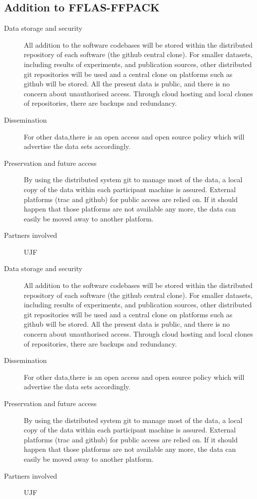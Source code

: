 \documentclass{../../Proposal/LaTeX-proposal/deliverablereport}
\begin{document}
\begin{enumerate}
\subsection{Addition to FFLAS-FFPACK}

\begin{description}
\item[Data storage and security] All addition to the software codebases will be stored within the distributed repository of each software (the github central clone). For smaller datasets, including results of experiments, and publication sources, other distributed git repositories will be used and a central clone on platforms such as github will be stored. All the present data is public, and there is no concern about unauthorised access. Through cloud hosting and local clones of repositories, there are backups and redundancy.
\item[Dissemination] For other data,there is an open access and open source policy which will advertise the data sets accordingly.
\item[Preservation and future access] By using the distributed system git to manage most of the data, a local copy of the data within each participant machine is assured. External platforms (trac and github) for public access are relied on. If it should happen that those platforms are not available any more, the data can easily be moved away to another platform.
\item[Partners involved] UJF
\end{description}

\begin{description}
\item[Data storage and security] All addition to the software codebases will be stored within the distributed repository of each software (the github central clone). For smaller datasets, including results of experiments, and publication sources, other distributed git repositories will be used and a central clone on platforms such as github will be stored. All the present data is public, and there is no concern about unauthorised access. Through cloud hosting and local clones of repositories, there are backups and redundancy.
\item[Dissemination] For other data,there is an open access and open source policy which will advertise the data sets accordingly.
\item[Preservation and future access] By using the distributed system git to manage most of the data, a local copy of the data within each participant machine is assured. External platforms (trac and github) for public access are relied on. If it should happen that those platforms are not available any more, the data can easily be moved away to another platform.
\item[Partners involved] UJF
\end{description}
\end{enumerate}
\end{document}
